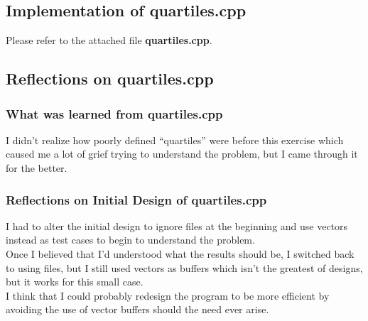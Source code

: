 \documentclass[11pt, oneside]{memoir}
\begin{document}
\subsection{Implementation of quartiles.cpp}
% 

Please refer to the attached file \textbf{quartiles.cpp}.

\subsection{Reflections on quartiles.cpp}

\subsubsection{What was learned from quartiles.cpp}

I didn't realize how poorly defined ``quartiles'' were before this
exercise which caused me a lot of grief trying to understand the
problem, but I came through it for the better.

\subsubsection{Reflections on Initial Design of quartiles.cpp}

I had to alter the initial design to ignore files at the beginning and
use vectors instead as test cases to begin to understand the
problem.\\

Once I believed that I'd understood what the results should be, I
switched back to using files, but I still used vectors as buffers
which isn't the greatest of designs, but it works for this small
case.  \\

I think that I could probably redesign the program to be more
efficient by avoiding the use of vector buffers should the need ever
arise. 
\end{document}
